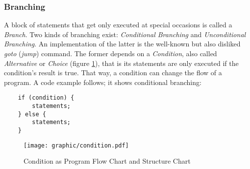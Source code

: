 %
%
%
%
%
%
%

\subsubsection{Branching}
\label{branching_heading}

A block of statements that get only executed at special occasions is called a
\emph{Branch}. Two kinds of branching exist: \emph{Conditional Branching} and
\emph{Unconditional Branching}. An implementation of the latter is the well-known
but also disliked \emph{goto} (\emph{jump}) command. The former depends on a
\emph{Condition}, also called \emph{Alternative} or \emph{Choice} (figure
\ref{condition_figure}), that is its statements are only executed if the
condition's result is true. That way, a condition can change the flow of a
program. A code example follows; it shows conditional branching:

\begin{scriptsize}
    \begin{verbatim}
    if (condition) {
        statements;
    } else {
        statements;
    }
    \end{verbatim}
\end{scriptsize}

\begin{figure}[ht]
    \begin{center}
        \texttt{[image: graphic/condition.pdf]}
        \caption{Condition as Program Flow Chart and Structure Chart}
        \label{condition_figure}
    \end{center}
\end{figure}

